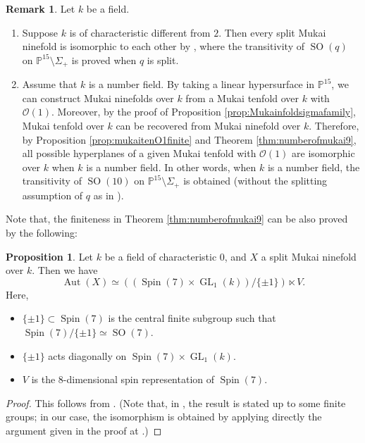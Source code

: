 \documentclass[autodetect-engine, a4paper]{amsart}
\theoremstyle{definition}
\newtheorem{prop}[thm]{Proposition}
\newtheorem{rem}[thm]{Remark}
\def\P{{\mathbb P}}
\def\cO{\mathcal{O}}
\DeclareMathOperator\GL{\mathrm{GL}}
\DeclareMathOperator\SO{\mathrm{SO}}
\DeclareMathOperator{\Spin}{\mathrm{Spin}}
\DeclareMathOperator\Aut{\mathrm{Aut}}
\begin{document}
\begin{rem}
\label{rem:mukai9}
Let $k$ be a field.
\begin{enumerate}
\item 
Suppose $k$ is of characteristic different from $2$.
Then every split Mukai ninefold is isomorphic to each other by \cite[Proposition 2]{Igusa}, where the transitivity of $\SO (q)$ on $\P^{15} \setminus \Sigma_{+}$ is proved when $q$ is split.

\item
Assume that $k$ is a number field.
By taking a linear hypersurface in $\P^{15}$, we can construct Mukai ninefolds over $k$ from a Mukai tenfold over $k$ with $\cO(1)$.
Moreover,  by the proof of Proposition \ref{prop:Mukainfoldsigmafamily}, 
Mukai tenfold over $k$ can be recovered from Mukai ninefold over $k$.
Therefore, by Proposition \ref{prop:mukaitenO1finite} and Theorem \ref{thm:numberofmukai9}, all possible hyperplanes of a given Mukai tenfold with $\cO(1)$ are isomorphic over $k$ when $k$ is a number field.
In other words, when $k$ is a number field, the transitivity of $\SO (10)$ on $\P^{15} \setminus \Sigma_{+}$ is obtained (without the splitting assumption of $q$ as in \cite{Igusa}). 
\end{enumerate}
\end{rem}

Note that, the finiteness in Theorem \ref{thm:numberofmukai9} can be also proved by the following:

\begin{prop}
\label{prop:autmukai9}
Let $k$ be a field of characteristic $0$, and $X$ a split Mukai ninefold over $k$.
Then we have 
\[
\Aut (X) \simeq ((\Spin(7)\times \GL_1(k))/\{\pm1\}) \ltimes  V.
\]
Here, 
\begin{itemize}
 \item $\{\pm 1\} \subset \Spin(7) $ is the central finite subgroup such that $\Spin(7)/\{\pm 1\} \simeq \SO(7)$.
 \item $\{\pm 1\}$ acts diagonally on $\Spin(7) \times \GL_1(k)$.
 \item $V$ is the $8$-dimensional spin representation of $\Spin(7)$.
\end{itemize}
\end{prop}

\begin{proof}
This follows from \cite[Proof of Lemma~1.17]{Pas09}.
(Note that, in \cite[Theorem~1.11 or Lemma~1.17]{Pas09}, the result is stated up to some finite groups;
in our case, the isomorphism is obtained by applying directly the argument given in the proof at \cite[page 974]{Pas09}.)
\end{proof}
\end{document}
